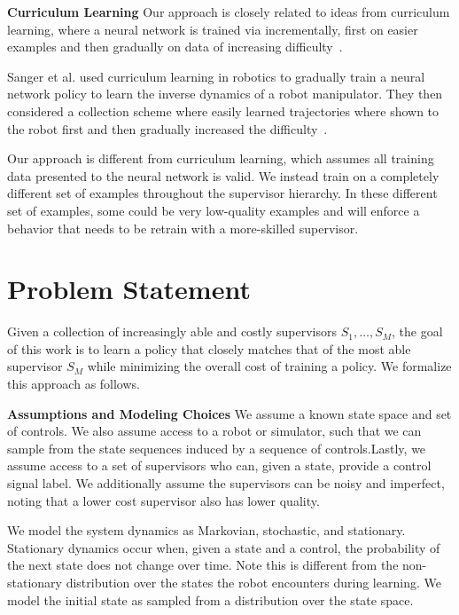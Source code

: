 \documentclass[10pt, conference]{ieeeconf}      %
\begin{document}
\noindent\textbf{Curriculum Learning}
Our approach is closely related to ideas from curriculum learning, where a neural network is trained via 
incrementally, first on easier examples and then gradually on data of increasing difficulty~\cite{bengio2009curriculum}.

Sanger et al. used curriculum learning in robotics to gradually train a neural network policy to learn the inverse
dynamics of a robot manipulator. They then considered a collection scheme where easily learned trajectories where shown
to the robot first and then gradually increased the difficulty~\cite{sanger1994neural}.

Our approach is different from curriculum learning, which assumes all training data presented to the neural network is valid.  We  instead train on a completely different set of examples throughout the supervisor hierarchy.  In these different set of examples, some could be very low-quality examples and will enforce a behavior that needs to be retrain with a more-skilled supervisor. 

\section{Problem Statement}
Given a collection of increasingly able and costly supervisors $S_1, \ldots, S_M$, the goal of this work is to learn a
policy that closely matches that of the most able supervisor $S_M$ while minimizing the overall cost of training a
policy. We formalize this approach as follows.

\noindent\textbf{Assumptions and Modeling Choices } 
We assume a known state space and set of controls. We also assume access to a robot or simulator, such that we  can sample from the state sequences induced by a sequence of controls.Lastly, we assume access to a set of supervisors who can, given a state, provide a control signal label. We additionally assume the supervisors can be noisy and imperfect, noting that a lower cost supervisor also has lower quality.

 We model the system dynamics as Markovian, stochastic, and stationary. Stationary dynamics occur when, given a state and a control, the probability of the next state does not change over time. Note this is different from the non-stationary distribution over the states the robot encounters during learning. We model the initial state as sampled from a distribution over the state space. 
\end{document}
